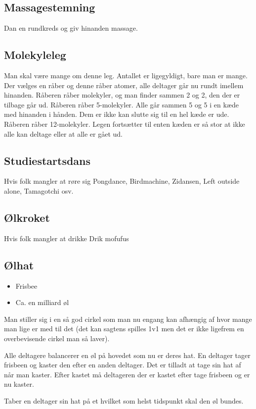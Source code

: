 \documentclass[../../main.tex]{subfiles}
\begin{document}
\begin{multicols}{2}
\subsection*{Massagestemning}
    Dan en rundkreds og giv hinanden massage.

\subsection*{Molekyleleg}
    Man skal være mange om denne leg. Antallet er ligegyldigt, bare man er mange. Der vælges en råber og denne råber atomer, alle deltager går nu rundt imellem hinanden. Råberen råber molekyler, og man finder sammen 2 og 2, den der er tilbage går ud. Råberen råber 5-molekyler. Alle går sammen 5 og 5 i en kæde med hinanden i hånden. Dem er ikke kan slutte sig til en hel kæde er ude. Råberen råber 12-molekyler. Legen fortsætter til enten kæden er så stor at ikke alle kan deltage eller at alle er gået ud. 
    
\subsection*{Studiestartsdans}{Hvis folk mangler at røre sig}
    Pongdance, Birdmachine, Zidansen, Left outside alone, Tamagotchi osv.
    
\subsection*{Ølkroket}{Hvis folk mangler at drikke}
    Drik mofufus

\subsection*{Ølhat}
    \begin{itemize}
        \item Frisbee
        \item Ca. en milliard øl
    \end{itemize}
    
    Man stiller sig i en så god cirkel som man nu engang kan afhængig af hvor mange man lige er med til det (det kan sagtens spilles 1v1 men det er ikke ligefrem en overbevisende cirkel man så laver). 
    
    Alle deltagere balancerer en øl på hovedet som nu er deres hat. En deltager tager frisbeen og kaster den efter en anden deltager. Det er tilladt at tage sin hat af når man kaster. Efter kastet må deltageren der er kastet efter tage frisbeen og er nu kaster. 
    
    Taber en deltager sin hat på et hvilket som helst tidspunkt skal den øl bundes.

\end{multicols}
\end{document}
